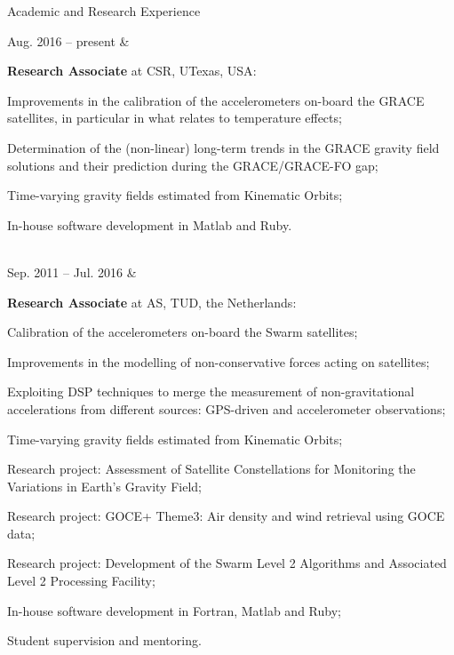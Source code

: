 \documentclass[a4paper,12pt]{article}
\begin{document}



\begin{cvsection}{Academic and Research Experience}

Aug. 2016 -- present &
  \begin{itti}
    \item \textbf{Research Associate} at \acf{CSR}, \acf{UTexas}, \ac{USA}:
    \begin{ittib}
      \item Improvements in the calibration of the accelerometers on-board the \acf{GRACE} satellites, in particular in what relates to temperature effects;
      \item Determination of the (non-linear) long-term trends in the \ac{GRACE} gravity field solutions and their prediction during the \ac{GRACE}\slash\acf{GRACE-FO} gap;
      \item Time-varying gravity fields estimated from Kinematic Orbits;
      \item In-house software development in Matlab and Ruby.
    \end{ittib}
  \end{itti}\\

Sep. 2011 -- Jul. 2016 &
  \begin{itti}
    \item \textbf{Research Associate} at \ac{AS}, \ac{TUD}, the Netherlands:
    \begin{ittib}
      \item Calibration of the accelerometers on-board the Swarm satellites;
      \item Improvements in the modelling of non-conservative forces acting on satellites;
      \item Exploiting \acf{DSP} techniques to merge the measurement of non-gravitational accelerations from different sources: \acf{GPS}-driven and accelerometer observations;
      \item Time-varying gravity fields estimated from Kinematic Orbits;
      \item Research project: Assessment of Satellite Constellations for Monitoring the Variations in Earth's Gravity Field;
      \item Research project: GOCE+ Theme3: Air density and wind retrieval using \acf{GOCE} data;
      \item Research project: Development of the Swarm Level 2 Algorithms and Associated Level 2 Processing Facility;
      \item In-house software development in Fortran, Matlab and Ruby;
      \item Student supervision and mentoring.
    \end{ittib}
  \end{itti}\\


\end{cvsection}
\end{document}
